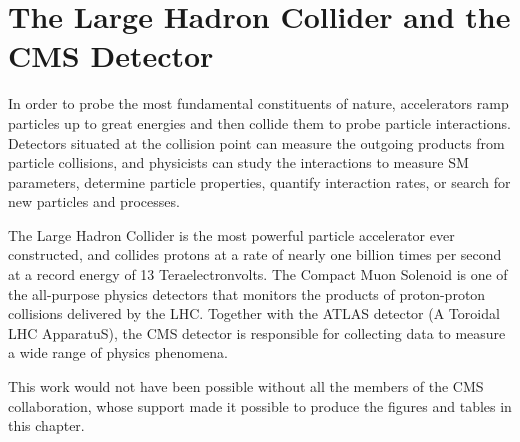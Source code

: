 \chapter{The Large Hadron Collider and the CMS Detector}
\label{ch:detector}

In order to probe the most fundamental constituents of nature, accelerators ramp particles up to great energies and then collide them to probe particle interactions. Detectors situated at the collision point can measure the outgoing products from particle collisions, and physicists can study the interactions to measure SM parameters, determine particle properties, quantify interaction rates, or search for new particles and processes.

The Large Hadron Collider is the most powerful particle accelerator ever constructed, and collides protons at a rate of nearly one billion times per second at a record energy of 13 Teraelectronvolts. The Compact Muon Solenoid is one of the all-purpose physics detectors that monitors the products of proton-proton collisions delivered by the LHC. Together with the ATLAS detector (A Toroidal LHC ApparatuS), the CMS detector is responsible for collecting data to measure a wide range of physics phenomena.





This work would not have been possible without all the members of the CMS collaboration, whose support made it possible to produce the figures and tables in this chapter.
